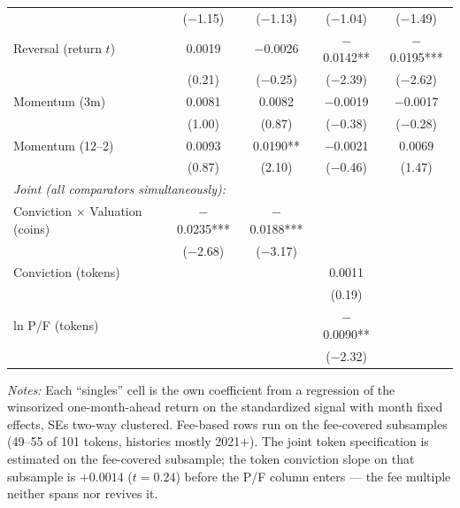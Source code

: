 \documentclass[12pt]{article}
\begin{document}
\begin{table}[ht]
\begin{tabular}{lcccc}
 & ($-$1.15) & ($-$1.13) & ($-$1.04) & ($-$1.49) \\
Reversal (return $t$) & 0.0019 & $-$0.0026 & $-$0.0142** & $-$0.0195*** \\
 & (0.21) & ($-$0.25) & ($-$2.39) & ($-$2.62) \\
Momentum (3m) & 0.0081 & 0.0082 & $-$0.0019 & $-$0.0017 \\
 & (1.00) & (0.87) & ($-$0.38) & ($-$0.28) \\
Momentum (12--2) & 0.0093 & 0.0190** & $-$0.0021 & 0.0069 \\
 & (0.87) & (2.10) & ($-$0.46) & (1.47) \\
\midrule
\multicolumn{5}{l}{\textit{Joint (all comparators simultaneously):}} \\
Conviction $\times$ Valuation (coins) & $-$0.0235*** & $-$0.0188*** & & \\
 & ($-$2.68) & ($-$3.17) & & \\
Conviction (tokens) & & & 0.0011 & \\
 & & & (0.19) & \\
ln P/F (tokens) & & & $-$0.0090** & \\
 & & & ($-$2.32) & \\
\bottomrule
\end{tabular}
\smallskip

\parbox{0.92\linewidth}{\footnotesize
\textit{Notes:} Each ``singles'' cell is the own coefficient from a regression of the
winsorized one-month-ahead return on the standardized signal with month fixed effects,
SEs two-way clustered. Fee-based rows run on the fee-covered subsamples (49--55 of 101
tokens, histories mostly 2021+). The joint token specification is estimated on the
fee-covered subsample; the token conviction slope on that subsample is $+0.0014$
($t=0.24$) before the P/F column enters --- the fee multiple neither spans nor revives
it.}
\end{table}
\end{document}
